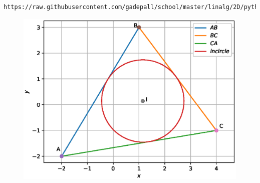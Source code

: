 \documentclass[journal,12pt,twocolumn]{IEEEtran}
\renewcommand\thesection{\arabic{section}}
\begin{document}
\begin{enumerate}[label=\thesection.\arabic*
,ref=\thesection.\theenumi]
\begin{lstlisting}
https://raw.githubusercontent.com/gadepall/school/master/linalg/2D/python_2d/codes/incircle.py
\end{lstlisting}
\begin{figure}
\centering
\includegraphics[width=\columnwidth]{./figs/incircle.eps}
\caption{}
\label{fig:incircle}
\end{figure}

\end{enumerate}
\end{document}
